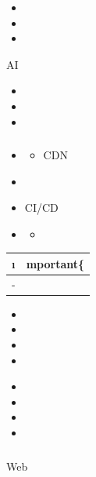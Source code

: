 \begin{itemize}
\item
  \important{}
\item
  \important{}
\item
  \important{}
\end{itemize}

\important{}

AI

\begin{itemize}
\item
  \important{}
\item
  \important{}
\item
  \important{}
\end{itemize}

\hypertarget{section-96}{%
\subsubsection{}\label{section-96}}

\important{}

\important{}

\begin{itemize}
\item
  \begin{itemize}
  \tightlist
  \item
    CDN
  \end{itemize}
\item
  \important{}
\item
  CI/CD
\item
  \begin{itemize}
  \tightlist
  \item
  \end{itemize}
\end{itemize}

\begin{longtable}[]{@{}ll@{}}
\toprule\noalign{}
\i & mportant\{} \\
\midrule\noalign{}
\endhead
\bottomrule\noalign{}
\endlastfoot
- & \important{} \\
\end{longtable}

\begin{itemize}
\item
  \important{}
\item
  \important{}
\item
  \important{}
\item
  \important{}
\end{itemize}

\important{}

\begin{itemize}
\item
  \important{}
\item
  \important{}
\item
  \important{}
\item
  \important{}
\end{itemize}

\hypertarget{section-97}{%
\subsubsection{}\label{section-97}}

\important{}\important{}

Web\important{}\important{}

\important{}